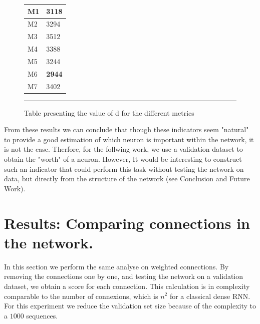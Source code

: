 \newpage

\begin{figure}[!htb]
    \centering
    \begin{tabular}{|l|l|}
        \hline
        M1 & 3118 \\ \hline
        M2 & 3294 \\ \hline
        M3 & 3512 \\ \hline
        M4 & 3388 \\ \hline
        M5 & 3244 \\ \hline
        M6 & \textbf{2944} \\ \hline
        M7 & 3402 \\
        \hline
    \end{tabular}
    \label{fig:metrics}
    \rule{35em}{0.5pt}
    \caption[Table presenting the value of d for the different metrics ]{Table presenting the value of d for the different metrics}
\end{figure}

From these results we can conclude that though these indicators seem "natural" to provide a good estimation of which neuron is important within the network, it is not the case. Therfore, for the follwing work, we use a validation dataset to obtain the "worth" of a neuron. However, It would be interesting to construct such an indicator that could perform this task without testing the network on data, but directly from the structure of the network (see Conclusion and Future Work).




\section{Results: Comparing connections in the network.}

In this section we perform the same analyse on weighted connections. By removing the connections one by one, and testing the network on a validation dataset, we obtain a score for each connection. This calculation is in complexity comparable to the number of connexions, which is $n ^2$ for a classical dense RNN. For this experiment we reduce the validation set size because of the complexity to a $1000$ sequences.


